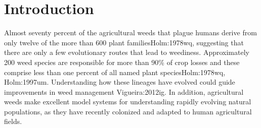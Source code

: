 \documentclass[twocolumn]{bmcart}%
\begin{document}

\linenumbers



\section*{Introduction}
Almost seventy percent of the agricultural weeds that plague humans derive from only twelve of the more than 600 plant families{Holm:1978wq}, suggesting that there are only a few evolutionary routes that lead to weediness. Approximately 200 weed species are responsible for more than 90\% of crop losses and these comprise less than one percent of all named plant species{Holm:1978wq, Holm:1997um}. Understanding how these lineages have evolved could guide improvements in weed management {Vigueira:2012ig}.  In addition, agricultural weeds make excellent model systems for understanding rapidly evolving natural populations, as they have recently colonized and adapted to human agricultural fields. 
%
%
%
\end{document}
